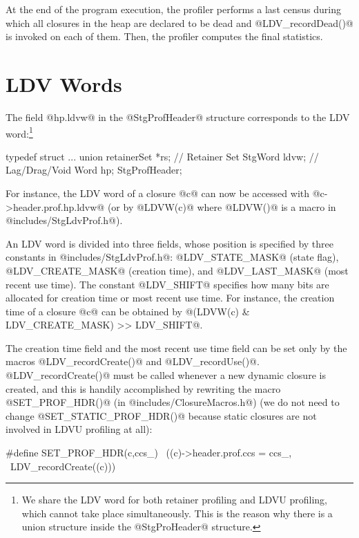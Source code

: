 \documentclass{article}
\begin{document}
At the end of the program execution, the profiler performs a last census during
which all closures in the heap are declared to be dead and @LDV_recordDead()@
is invoked on each of them. 
Then, the profiler computes the final statistics. 

\section{LDV Words}

The field @hp.ldvw@ in the @StgProfHeader@ structure corresponds to the LDV 
word:\footnote{We share the LDV word for both retainer profiling and LDVU 
profiling, which cannot take place simultaneously. This is the reason why there is a
union structure inside the @StgProHeader@ structure.}
\begin{code}
typedef struct {
  ...
  union {
    retainerSet *rs;          // Retainer Set
    StgWord ldvw;             // Lag/Drag/Void Word
  } hp;
} StgProfHeader;
\end{code}
For instance, the LDV word of a closure @c@ can now be accessed with 
@c->header.prof.hp.ldvw@ (or by @LDVW(c)@ where @LDVW()@ is a macro in 
@includes/StgLdvProf.h@).

An LDV word is divided into three fields, whose position is specified
by three constants in @includes/StgLdvProf.h@:
@LDV_STATE_MASK@ (state flag), @LDV_CREATE_MASK@ (creation time), and 
@LDV_LAST_MASK@ (most recent use time). 
The constant @LDV_SHIFT@ specifies how many bits are allocated for 
creation time or most recent use time.
For instance, the creation time of a closure @c@ can be obtained by
@(LDVW(c) & LDV_CREATE_MASK) >> LDV_SHIFT@.

The creation time field and the most recent use time field can be set only by the 
macros @LDV_recordCreate()@ and @LDV_recordUse()@. 
@LDV_recordCreate()@ must be called whenever a new dynamic closure is created,
and this is handily accomplished by rewriting the macro @SET_PROF_HDR()@ 
(in @includes/ClosureMacros.h@) (we do not need to change @SET_STATIC_PROF_HDR()@
because static closures are not involved in LDVU profiling at all):

\begin{code}
#define SET_PROF_HDR(c,ccs_)            \
        ((c)->header.prof.ccs = ccs_,   \
        LDV_recordCreate((c)))
\end{code}
\end{document}

